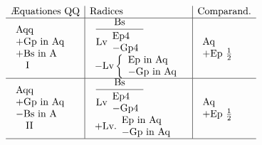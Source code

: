 \documentclass[11pt,a4paper]{article}
\begin{document}
\[ \begin{array}{l|l|l}
\text{Æquationes QQ} & \text{Radices} & \text{Comparand.} \\ \hline
\begin{array}{l} \text{Aqq} \\ +\text{Gp in Aq} \\ +\text{Bs in A} \\ \quad\text{I} \end{array} & \begin{array}{l} \dfrac{\text{Bs}}{\text{Lv}\begin{array}{l} \text{Ep4} \\ -\text{Gp4} \end{array}} \\ -\text{Lv}\left\{\begin{array}{l} \text{Ep in Aq} \\ -\text{Gp in Aq} \end{array}\right. \end{array} & \begin{array}{l} \text{Aq} \\ +\text{Ep } \tfrac{1}{2} \end{array} \\ \hline
\begin{array}{l} \text{Aqq} \\ +\text{Gp in Aq} \\ -\text{Bs in A} \\ \quad\text{II} \end{array} & \begin{array}{l} \dfrac{\text{Bs}}{\text{Lv}\begin{array}{l} \text{Ep4} \\ -\text{Gp4} \end{array}} \\ +\text{Lv.}\begin{array}{l} \text{Ep in Aq} \\ -\text{Gp in Aq} \end{array} \end{array} & \begin{array}{l} \text{Aq} \\ +\text{Ep } \tfrac{1}{2} \end{array} \\ \hline

\end{array}\]
\end{document}
